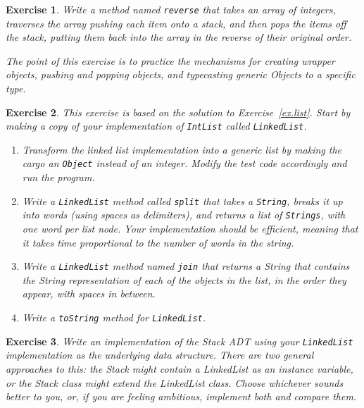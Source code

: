 \documentclass[12pt]{book}
\theoremstyle{exercise}
\newtheorem{exercise}{Exercise}[chapter]
\begin{document}
\begin{exercise}
Write a method named {\tt reverse} that takes an array of integers,
traverses the array pushing each item onto a stack, and then pops
the items off the stack, putting them back into the array in the
reverse of their original order.

The point of this exercise is to practice the mechanisms for creating
wrapper objects, pushing and popping objects, and typecasting generic
Objects to a specific type.
\end{exercise}


\begin{exercise}
This exercise is based on the solution to Exercise~\ref{ex.list}.
Start by making a copy of your implementation of {\tt IntList}
called {\tt LinkedList}.

\begin {enumerate}

\item Transform the linked list implementation into a generic list by
making the cargo an {\tt Object} instead of an integer.
Modify the test code accordingly and run the program.

\item Write a {\tt LinkedList} method called {\tt split} that takes a
{\tt String}, breaks it up into words (using spaces as delimiters), and
returns a list of {\tt Strings}, with one word per list node.
Your implementation should be efficient, meaning that it takes
time proportional to the number of words in the string.

\item Write a {\tt LinkedList} method named {\tt join} that
returns a String that contains
the String representation of each of the objects in the list, in the order
they appear, with spaces in between.

\item Write a {\tt toString} method for {\tt LinkedList}. 

\end{enumerate}
\end{exercise}


\begin{exercise}
Write an implementation of the Stack ADT using your {\tt LinkedList}
implementation as the underlying data structure.  There are two
general approaches to this: the Stack might contain a LinkedList
as an instance variable, or the Stack class might extend the
LinkedList class.  Choose whichever sounds better to you, or,
if you are feeling ambitious, implement both and compare them.
\end{exercise}
\end{document}
